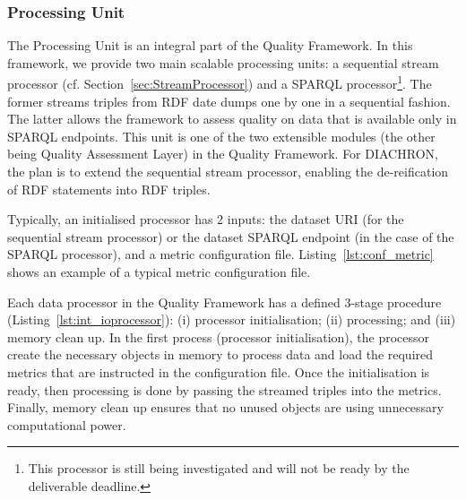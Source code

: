 \subsubsection{Processing Unit}
\label{sec:processingUnit}
The Processing Unit is an integral part of the Quality Framework.
In this framework, we provide two main scalable processing units: a sequential stream processor (cf. Section~\ref{sec:StreamProcessor}) and a SPARQL processor\footnote{This processor is still being investigated and will not be ready by the deliverable deadline.}.
The former streams triples from RDF date dumps one by one in a sequential fashion.
The latter allows the framework to assess quality on data that is available only in SPARQL endpoints. 
This unit is one of the two extensible modules (the other being Quality Assessment Layer) in the Quality Framework.
For DIACHRON, the plan is to extend the sequential stream processor, enabling the de-reification of RDF statements into RDF triples.

Typically, an initialised processor has 2 inputs: the dataset URI (for the sequential stream processor) or the dataset SPARQL endpoint (in the case of the SPARQL processor), and a metric configuration file.
Listing~\ref{lst:conf_metric} shows an example of a typical metric configuration file.
 
Each data processor in the Quality Framework has a defined 3-stage procedure (Listing~\ref{lst:int_ioprocessor}): (i) processor initialisation; (ii) processing; and (iii) memory clean up.
In the first process (processor initialisation), the processor create the necessary objects in memory to process data and load the required metrics that are instructed in the configuration file.
Once the initialisation is ready, then processing is done by passing the streamed triples into the metrics.
Finally, memory clean up ensures that no unused objects are using unnecessary computational power.
 

